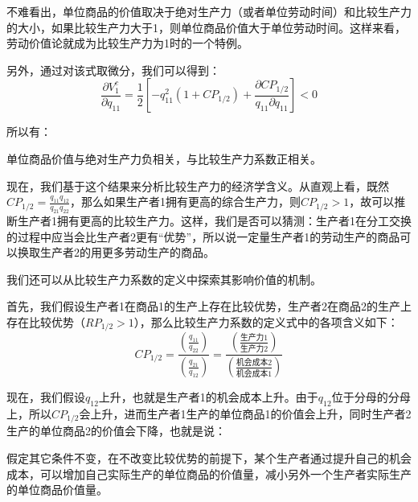 不难看出，单位商品的价值取决于绝对生产力（或者单位劳动时间）和比较生产力的大小，如果比较生产力大于1，则单位商品价值大于单位劳动时间。这样来看，劳动价值论就成为比较生产力为1时的一个特例\cite[72]{CaiJiMingCongXiaYiJieZhiLunDaoGuangYiJieZhiLunXiuDingBan2022}。

另外，通过对该式取微分，我们可以得到\cite[93]{CaiJiMingCongXiaYiJieZhiLunDaoGuangYiJieZhiLunXiuDingBan2022}：
\begin{equation}
    \frac{\partial V_1^c}{\partial q_{11}} = \frac{1}{2} \left[ -q_{11}^2 \left( 1 + \mathit{CP}_{1/2} \right) + \frac{\partial \mathit{CP}_{1/2}}{q_{11}\partial q_{11}} \right] < 0
\end{equation}

所以有：

\begin{theorem}
    单位商品价值与绝对生产力负相关，与比较生产力系数正相关\cite[92]{CaiJiMingCongXiaYiJieZhiLunDaoGuangYiJieZhiLunXiuDingBan2022}。
\end{theorem}

现在，我们基于这个结果来分析比较生产力的经济学含义。从直观上看，既然$\mathit{CP}_{1/2} = \frac{q_{11}q_{12}}{q_{21}q_{22}}$，那么如果生产者1拥有更高的综合生产力，则$ \mathit{CP}_{1/2} > 1 $，故可以推断生产者1拥有更高的比较生产力。这样，我们是否可以猜测：生产者1在分工交换的过程中应当会比生产者2更有“优势”，所以说一定量生产者1的劳动生产的商品可以换取生产者2的用更多劳动生产的商品。

我们还可以从比较生产力系数的定义中探索其影响价值的机制。

首先，我们假设生产者1在商品1的生产上存在比较优势，生产者2在商品2的生产上存在比较优势（$ \mathit{RP}_{1/2} > 1 $），那么比较生产力系数的定义式中的各项含义如下：
\begin{equation}
    \mathit{CP}_{1/2} = \frac{\left(\frac{q_{11}}{q_{22}}\right)}{\left(\frac{q_{21}}{q_{12}}\right)} = \frac{\left(\frac{\text{生产力1}}{\text{生产力2}}\right)}{\left(\frac{\text{机会成本2}}{\text{机会成本1}}\right)}
\end{equation}

现在，我们假设$ q_{12} $上升，也就是生产者1的机会成本上升。由于$ q_{12} $位于分母的分母上，所以$\mathit{CP}_{1/2} $会上升，进而生产者1生产的单位商品1的价值会上升，同时生产者2生产的单位商品2的价值会下降，也就是说：

\begin{proposition}
    假定其它条件不变，在不改变比较优势的前提下，某个生产者通过提升自己的机会成本，可以增加自己实际生产的单位商品的价值量，减小另外一个生产者实际生产的单位商品价值量。
\end{proposition}

